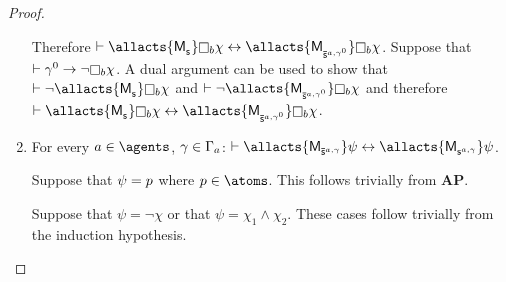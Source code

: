 \begin{proof}
\begin{enumerate}
            Therefore $\proves \allacts{\aPModel{\aStateS}} \necessary[\agentB] \chi \iff \allacts{\aPModel{\aPStateS[\agentA,\gamma^0]}} \necessary[\agentB] \chi$.
            Suppose that $\proves \gamma^0 \implies \neg \necessary[\agentB] \chi$.
            A dual argument can be used to show that $\proves \neg \allacts{\aPModel{\aStateS}} \necessary[\agentB] \chi$ and $\proves \neg \allacts{\aPModel{\aPStateS[\agentA,\gamma^0]}} \necessary[\agentB] \chi$ and therefore $\proves \allacts{\aPModel{\aStateS}} \necessary[\agentB] \chi \iff \allacts{\aPModel{\aPStateS[\agentA,\gamma^0]}} \necessary[\agentB] \chi$.

        \item For every $\agentA \in \agents$, $\gamma \in \Gamma_a$: $\proves \allacts{\aPModel{\aPStateS[\agentA,\gamma]}} \psi \iff \allacts{\aPModel{\aStateS[\agentA,\gamma]}} \psi$.

            Suppose that $\psi = p$ where $\atomP \in \atoms$. 
            This follows trivially from {\bf AP}.

            Suppose that $\psi = \neg \chi$ or that $\psi = \chi_1 \land \chi_2$. These cases follow trivially from the induction hypothesis.


\end{enumerate}
\end{proof}
